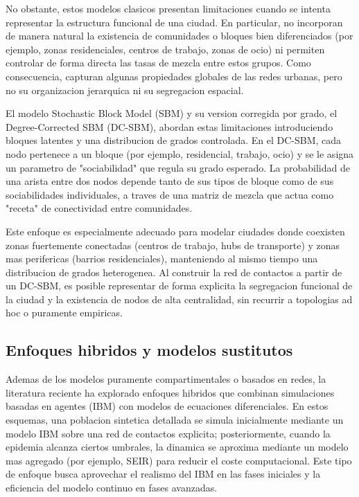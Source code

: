 No obstante, estos modelos clasicos presentan limitaciones cuando se intenta representar la estructura funcional de una ciudad. 
En particular, no incorporan de manera natural la existencia de comunidades o bloques bien diferenciados (por ejemplo, zonas residenciales, centros de trabajo, zonas de ocio) ni permiten controlar de forma directa las tasas de mezcla entre estos grupos. 
Como consecuencia, capturan algunas propiedades globales de las redes urbanas, pero no su organizacion jerarquica ni su segregacion espacial.

El modelo Stochastic Block Model (SBM) y su version corregida por grado, el Degree-Corrected SBM (DC-SBM), abordan estas limitaciones introduciendo bloques latentes y una distribucion de grados controlada. 
En el DC-SBM, cada nodo pertenece a un bloque (por ejemplo, residencial, trabajo, ocio) y se le asigna un parametro de "sociabilidad" que regula su grado esperado. 
La probabilidad de una arista entre dos nodos depende tanto de sus tipos de bloque como de sus sociabilidades individuales, a traves de una matriz de mezcla que actua como "receta" de conectividad entre comunidades.

Este enfoque es especialmente adecuado para modelar ciudades donde coexisten zonas fuertemente conectadas (centros de trabajo, hubs de transporte) y zonas mas perifericas (barrios residenciales), manteniendo al mismo tiempo una distribucion de grados heterogenea. 
Al construir la red de contactos a partir de un DC-SBM, es posible representar de forma explicita la segregacion funcional de la ciudad y la existencia de nodos de alta centralidad, sin recurrir a topologias ad hoc o puramente empiricas.

\subsection{Enfoques hibridos y modelos sustitutos}

Ademas de los modelos puramente compartimentales o basados en redes, la literatura reciente ha explorado enfoques hibridos que combinan simulaciones basadas en agentes (IBM) con modelos de ecuaciones diferenciales. 
En estos esquemas, una poblacion sintetica detallada se simula inicialmente mediante un modelo IBM sobre una red de contactos explicita; posteriormente, cuando la epidemia alcanza ciertos umbrales, la dinamica se aproxima mediante un modelo mas agregado (por ejemplo, SEIR) para reducir el coste computacional. 
Este tipo de enfoque busca aprovechar el realismo del IBM en las fases iniciales y la eficiencia del modelo continuo en fases avanzadas.

